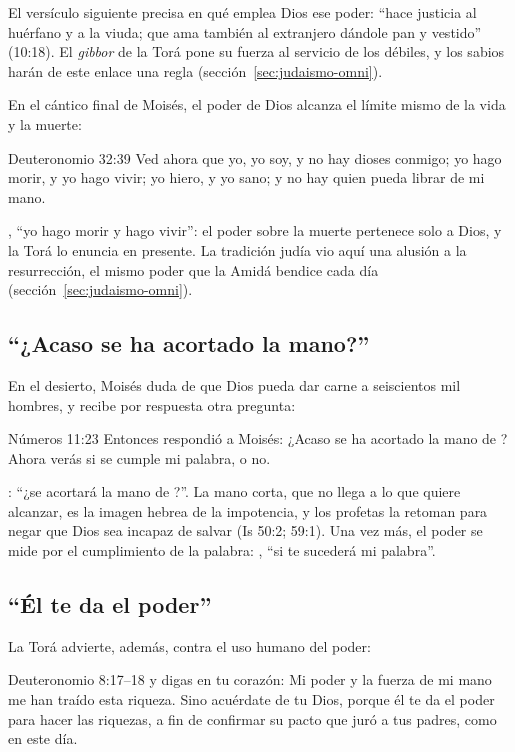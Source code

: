El versículo siguiente precisa en qué emplea Dios ese poder: ``hace justicia al huérfano y a la viuda; que ama también al extranjero dándole pan y vestido'' (10:18). El \emph{gibbor} de la Torá pone su fuerza al servicio de los débiles, y los sabios harán de este enlace una regla (sección~\ref{sec:judaismo-omni}).

En el cántico final de Moisés, el poder de Dios alcanza el límite mismo de la vida y la muerte:

\begin{verso}{Deuteronomio 32:39}
Ved ahora que yo, yo soy, y no hay dioses conmigo; yo hago morir, y yo hago vivir; yo hiero, y yo sano; y no hay quien pueda librar de mi mano.
\end{verso}

, ``yo hago morir y hago vivir'': el poder sobre la muerte pertenece solo a Dios, y la Torá lo enuncia en presente. La tradición judía vio aquí una alusión a la resurrección, el mismo poder que la Amidá bendice cada día (sección~\ref{sec:judaismo-omni}).

\subsection{“¿Acaso se ha acortado la mano?”}

En el desierto, Moisés duda de que Dios pueda dar carne a seiscientos mil hombres, y recibe por respuesta otra pregunta:

\begin{verso}{Números 11:23}
Entonces \SENOR{} respondió a Moisés: ¿Acaso se ha acortado la mano de \SENOR? Ahora verás si se cumple mi palabra, o no.
\end{verso}

: ``¿se acortará la mano de \SENOR?''. La mano corta, que no llega a lo que quiere alcanzar, es la imagen hebrea de la impotencia, y los profetas la retoman para negar que Dios sea incapaz de salvar (Is 50:2; 59:1). Una vez más, el poder se mide por el cumplimiento de la palabra: , ``si te sucederá mi palabra''.

\subsection{“Él te da el poder”}

La Torá advierte, además, contra el uso humano del poder:

\begin{verso}{Deuteronomio 8:17–18}
y digas en tu corazón: Mi poder y la fuerza de mi mano me han traído esta riqueza. Sino acuérdate de \SENOR{} tu Dios, porque él te da el poder para hacer las riquezas, a fin de confirmar su pacto que juró a tus padres, como en este día.
\end{verso}

